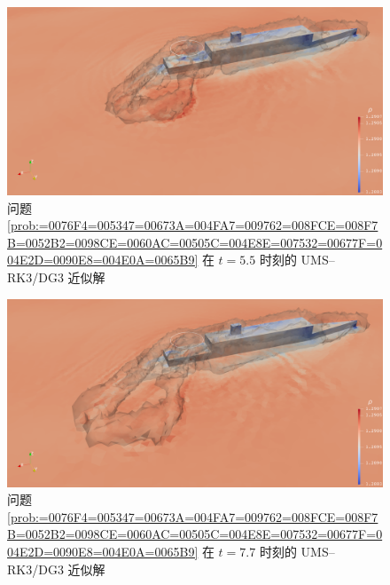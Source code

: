 \begin{figure}[h!]
\begin{centering}
\includegraphics[width=1\textwidth,height=0.28\textheight,keepaspectratio]{figures/ship/a=45_u=10/Frame55}
\par\end{centering}
\caption{\label{fig:ship_u=00003D10_a=00003D45_t=00003D55e-1}问题 \ref{prob:=0076F4=005347=00673A=004FA7=009762=008FCE=008F7B=0052B2=0098CE=0060AC=00505C=004E8E=007532=00677F=004E2D=0090E8=004E0A=0065B9}
在 $t=5.5$ 时刻的 UMS–RK3/DG3 近似解}
\end{figure}

\begin{figure}[h!]
\begin{centering}
\includegraphics[width=1\textwidth,height=0.28\textheight,keepaspectratio]{figures/ship/a=45_u=10/Frame77}
\par\end{centering}
\caption{\label{fig:ship_u=00003D10_a=00003D45_t=00003D77e-1}问题 \ref{prob:=0076F4=005347=00673A=004FA7=009762=008FCE=008F7B=0052B2=0098CE=0060AC=00505C=004E8E=007532=00677F=004E2D=0090E8=004E0A=0065B9}
在 $t=7.7$ 时刻的 UMS–RK3/DG3 近似解}
\end{figure}

